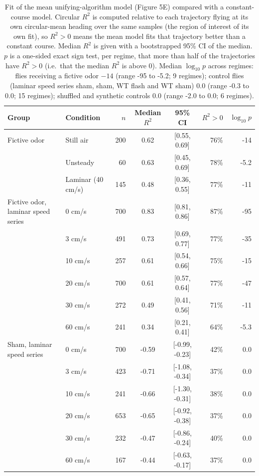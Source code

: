 \begin{table}[ht]
\centering
\caption{Fit of the mean unifying-algorithm model (Figure 5E) compared with a constant-course model. Circular $R^2$ is computed relative to each trajectory flying at its own circular-mean heading over the same samples (the region of interest of its own fit), so $R^2 > 0$ means the mean model fits that trajectory better than a constant course. Median $R^2$ is given with a bootstrapped 95\% CI of the median. $p$ is a one-sided exact sign test, per regime, that more than half of the trajectories have $R^2 > 0$ (i.e.\ that the median $R^2$ is above 0). Median $\log_{10} p$ across regimes: flies receiving a fictive odor $-14$ (range -95 to -5.2; 9 regimes); control flies (laminar speed series sham, sham, WT flash and WT sham) $0.0$ (range -0.3 to 0.0; 15 regimes); shuffled and synthetic controls $0.0$ (range -2.0 to 0.0; 6 regimes).}
\label{tab:mean_model_pvalues}
\begin{tabular}{llrccrr}
\hline
Group & Condition & $n$ & Median $R^2$ & 95\% CI & $R^2 > 0$ & $\log_{10} p$ \\
\hline
Fictive odor & Still air & 200 & 0.62 & [0.55, 0.69] & 76\% & -14 \\
 & Unsteady & 60 & 0.63 & [0.45, 0.69] & 78\% & -5.2 \\
 & Laminar (40 cm/s) & 145 & 0.48 & [0.36, 0.55] & 77\% & -11 \\
\hline
Fictive odor, laminar speed series & 0 cm/s & 700 & 0.83 & [0.81, 0.86] & 87\% & -95 \\
 & 3 cm/s & 491 & 0.73 & [0.69, 0.77] & 77\% & -35 \\
 & 10 cm/s & 257 & 0.61 & [0.54, 0.66] & 75\% & -15 \\
 & 20 cm/s & 700 & 0.61 & [0.57, 0.64] & 77\% & -47 \\
 & 30 cm/s & 272 & 0.49 & [0.41, 0.56] & 71\% & -11 \\
 & 60 cm/s & 241 & 0.34 & [0.21, 0.41] & 64\% & -5.3 \\
\hline
Sham, laminar speed series & 0 cm/s & 700 & -0.59 & [-0.99, -0.23] & 42\% & 0.0 \\
 & 3 cm/s & 423 & -0.71 & [-1.08, -0.34] & 37\% & 0.0 \\
 & 10 cm/s & 241 & -0.66 & [-1.30, -0.31] & 38\% & 0.0 \\
 & 20 cm/s & 653 & -0.65 & [-0.92, -0.38] & 37\% & 0.0 \\
 & 30 cm/s & 232 & -0.47 & [-0.86, -0.24] & 40\% & 0.0 \\
 & 60 cm/s & 167 & -0.44 & [-0.63, -0.17] & 37\% & 0.0 \\

\end{tabular}
\end{table}
